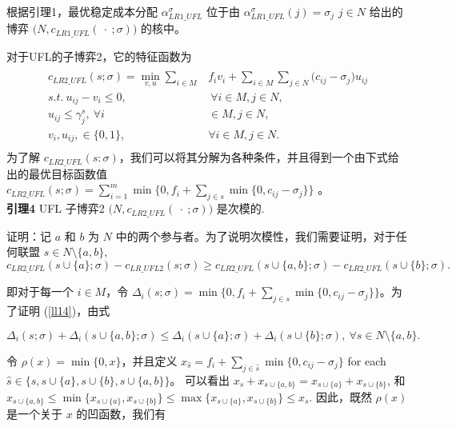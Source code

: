 \documentclass[UTF8]{article}
\begin{document}
\begin{定义}
      根据引理1，最优稳定成本分配 $\alpha_{LR1\_UFL}^{\sigma}$ 位于由 $\alpha_{LR1\_UFL}^{\sigma}(j) = \sigma_j$ $j \in N$ 给出的博弈 $\big(N, c_{LR1\_UFL}(\ \cdot \ ;\sigma)\big)$ 的核中。

      对于UFL的子博弈2，它的特征函数为
      \begin{eqnarray}\label{eqn:UFLCFsub2}
      \begin{aligned}
      \begin{split}
      c_{LR2\_UFL}(s;\sigma) = \min_{v,u} \sum_{i \in M} &f_iv_i + \sum_{i \in M} \sum_{j \in N} \big(c_{ij} - \sigma_{j}\big)u_{ij}\\
      s.t.~u_{ij} - v_i \leq 0,&~\forall i \in M, j \in N,\\
      u_{ij} \leq \gamma_j^s,~\forall i& \in M, j \in N,\\
       v_i,u_{ij}, \in \{0,1\},~&\forall i \in M, j \in N.
      \end{split}
      \end{aligned}
      \end{eqnarray}
      为了解 $c_{LR2\_UFL}(s:\sigma)$，我们可以将其分解为各种条件，并且得到一个由下式给出的最优目标函数值 $c_{LR2\_UFL}(s;\sigma) = \sum_{i=1}^m \min \big\{0,f_i+\sum_{j \in s} \min \{0,c_{ij}-\sigma_j\}\big\}$ 。\\

      \textbf{引理4}
      UFL 子博弈2 $\big(N,c_{LR2\_UFL}(\ \cdot \ ;\sigma)\big)$ 是次模的.

      证明：记 $a$ 和 $b$ 为 $N$ 中的两个参与者。为了说明次模性，我们需要证明，对于任何联盟 $s \in N\setminus \big\{a,b\big\}$,
      \begin{equation}\label{ll14}
      c_{LR2\_UFL}(s \cup \{a\}; \sigma) - c_{LR\_UFL2}(s;\sigma) \geq c_{LR2\_UFL}(s \cup \big\{a,b\big\};\sigma) - c_{LR2\_UFL}(s \cup \{b\};\sigma).
      \end{equation}

      即对于每一个 $i\in M$，令 $\Delta_i(s;\sigma) = \min \{0, f_i + \sum_{j \in s} \min \{0, c_{ij} - \sigma_j\} \}$。为了证明 (\ref{ll14})，由式

      \begin{equation}\label{eqn:submodularufl}
      \Delta_i(s;\sigma) + \Delta_i(s \cup \{a,b\};\sigma) \leq \Delta_i(s \cup \{a\};\sigma) + \Delta_i(s \cup \{b\};\sigma), ~\forall s \in N\setminus\big\{a,b\big\}. \end{equation}

      令 $\rho(x)=\min\{0,x\}$，并且定义 $x_{\hat{s}}= f_i + \sum_{j \in \hat{s}} \min \{0, c_{ij} - \sigma_j\}$ for each $\hat{s}\in \{s,s\cup\{a\},s\cup\{b\},s\cup\{a,b\}\}$。
      可以看出 $x_s+x_{s\cup\{a,b\}} = x_{s\cup \{a\}}+x_{s\cup\{b\}}$, 和 $x_{s\cup\{a,b\}}\leq \min\{x_{s\cup \{a\}},x_{s\cup\{b\}}\}\leq  \max\{x_{s\cup \{a\}},x_{s\cup\{b\}}\} \leq x_{s}$.
      因此，既然 $\rho(x)$ 是一个关于 $x$ 的凹函数，我们有


\end{定义}
\end{document}
